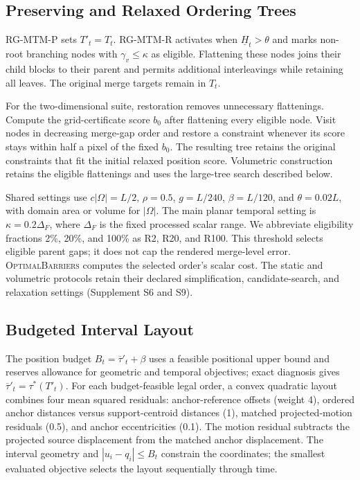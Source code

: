 \subsection{Preserving and Relaxed Ordering Trees}\label{sec:relaxation}
RG-MTM-P sets $T'_t=T_t$. RG-MTM-R activates when $\underline H_t>\theta$ and marks non-root branching nodes with $\gamma_v\le\kappa$ as eligible. Flattening these nodes joins their child blocks to their parent and permits additional interleavings while retaining all leaves. The original merge targets remain in $T_t$.

For the two-dimensional suite, restoration removes unnecessary flattenings. Compute the grid-certificate score $b_0$ after flattening every eligible node. Visit nodes in decreasing merge-gap order and restore a constraint whenever its score stays within half a pixel of the fixed $b_0$. The resulting tree retains the original constraints that fit the initial relaxed position score. Volumetric construction retains the eligible flattenings and uses the large-tree search described below.

Shared settings use $c|\Omega|=L/2$, $\rho=0.5$, $g=L/240$, $\beta=L/120$, and $\theta=0.02L$, with domain area or volume for $|\Omega|$. The main planar temporal setting is $\kappa=0.2\Delta_F$, where $\Delta_F$ is the fixed processed scalar range. We abbreviate eligibility fractions 2\%, 20\%, and 100\% as R2, R20, and R100. This threshold selects eligible parent gaps; it does not cap the rendered merge-level error. \textsc{OptimalBarriers} computes the selected order's scalar cost. The static and volumetric protocols retain their declared simplification, candidate-search, and relaxation settings (Supplement S6 and S9).

\subsection{Budgeted Interval Layout}
The position budget $B_t=\overline\tau'_t+\beta$ uses a feasible positional upper bound and reserves allowance for geometric and temporal objectives; exact diagnosis gives $\overline\tau'_t=\tau^*(T'_t)$. For each budget-feasible legal order, a convex quadratic layout combines four mean squared residuals: anchor-reference offsets (weight 4), ordered anchor distances versus support-centroid distances (1), matched projected-motion residuals (0.5), and anchor eccentricities (0.1). The motion residual subtracts the projected source displacement from the matched anchor displacement. The interval geometry and $|u_i-q_i|\le B_t$ constrain the coordinates; the smallest evaluated objective selects the layout sequentially through time.


